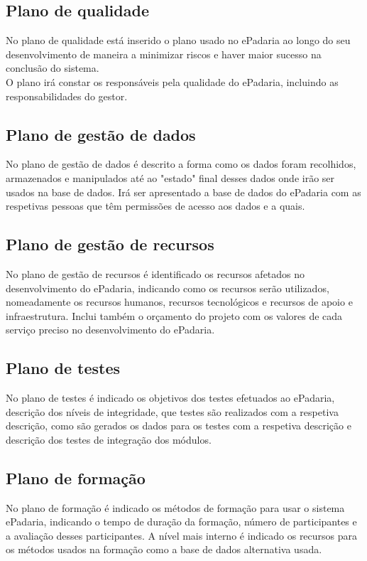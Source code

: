 \subsection{Plano de qualidade}
No plano de qualidade está inserido o plano usado no ePadaria ao longo do seu desenvolvimento de maneira a minimizar riscos e haver maior sucesso na conclusão do sistema. \\ O plano irá constar os responsáveis pela qualidade do ePadaria, incluindo as responsabilidades do gestor.

\subsection{Plano de gestão de dados}
No plano de gestão de dados é descrito a forma como os dados foram recolhidos, armazenados e manipulados até ao "estado" final desses dados onde irão ser usados na base de dados. Irá ser apresentado a base de dados do ePadaria com as respetivas pessoas que têm permissões de acesso aos dados e a quais.
\subsection{Plano de gestão de recursos}
No plano de gestão de recursos é identificado os recursos afetados no desenvolvimento do ePadaria, indicando como os recursos serão utilizados, nomeadamente os recursos humanos, recursos tecnológicos e recursos de apoio e infraestrutura. Inclui também o orçamento do projeto com os valores de cada serviço preciso no desenvolvimento do ePadaria.

\subsection{Plano de testes}
No plano de testes é indicado os objetivos dos testes efetuados ao ePadaria, descrição dos níveis de integridade, que testes são realizados com a respetiva descrição, como são gerados os dados para os testes com a respetiva descrição e descrição dos testes de integração dos módulos.
\subsection{Plano de formação}
No plano de formação é indicado os métodos de formação para usar o sistema ePadaria, indicando o tempo de duração da formação, número de participantes e a avaliação desses participantes. A nível mais interno é indicado os recursos para os métodos usados na formação como a base de dados alternativa usada.
